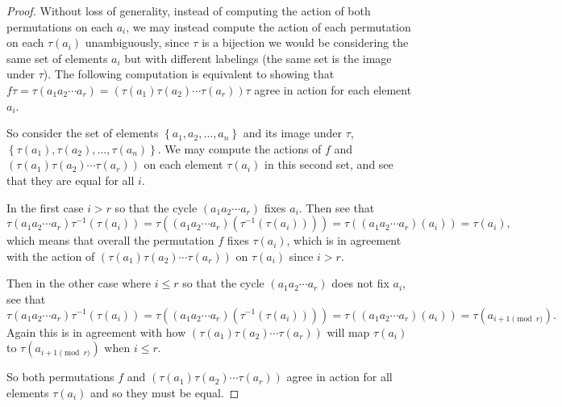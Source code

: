 \documentclass[11pt]{article}
\newcommand{\cbr}[1]{\left\{#1\right\}}
\begin{document}
\begin{enumerate}
\begin{proof}
    Without loss of generality, instead of computing the action of both permutations on each $a_i$, we may instead compute the action of each permutation on each $\tau(a_i)$ unambiguously, since $\tau$ is a bijection we would be considering the same set of elements $a_i$ but with different labelings (the same set is the image under $\tau$). The following computation is equivalent to showing that $f\tau = \tau(a_1a_2\cdots a_r) = (\tau(a_1)\tau(a_2)\cdots\tau(a_r))\tau$ agree in action for each element $a_i$.
  
    So consider the set of elements $\cbr{a_1,a_2,\dots,a_n}$ and its image under $\tau$, $\cbr{\tau(a_1), \tau(a_2), \dots, \tau(a_n)}$. We may compute the actions of $f$ and $(\tau(a_1)\tau(a_2)\cdots\tau(a_r))$ on each element $\tau(a_i)$ in this second set, and see that they are equal for all $i$.
  
    In the first case $i>r$ so that the cycle $(a_1a_2\cdots a_r)$ fixes $a_i$. Then see that \[\tau(a_1a_2\cdots a_r)\tau^{-1}(\tau(a_i)) = \tau((a_1a_2\cdots a_r)(\tau^{-1}(\tau(a_i)))) = \tau((a_1a_2\cdots a_r)(a_i)) = \tau(a_i),\] which means that overall the permutation $f$ fixes $\tau(a_i)$, which is in agreement with the action of $(\tau(a_1)\tau(a_2)\cdots\tau(a_r))$ on $\tau(a_i)$ since $i>r$.
  
    Then in the other case where $i\leq r$ so that the cycle $(a_1a_2\cdots a_r)$ does not fix $a_i$, see that \[\tau(a_1a_2\cdots a_r)\tau^{-1}(\tau(a_i)) = \tau((a_1a_2\cdots a_r)(\tau^{-1}(\tau(a_i)))) = \tau((a_1a_2\cdots a_r)(a_i)) = \tau(a_{i+1 \pmod r}).\] Again this is in agreement with how $(\tau(a_1)\tau(a_2)\cdots\tau(a_r))$ will map $\tau(a_i)$ to $\tau(a_{i+1 \pmod r})$ when $i\leq r$.
  
    So both permutations $f$ and $(\tau(a_1)\tau(a_2)\cdots\tau(a_r))$ agree in action for all elements $\tau(a_i)$ and so they must be equal.\end{proof}
\end{enumerate}
\end{document}

